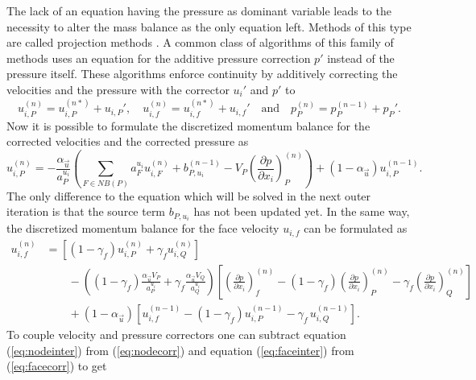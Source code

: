 The lack of an equation having the pressure as dominant variable leads to the necessity to alter the mass balance as the only equation left. Methods of this type are called projection methods \cite{ferziger02}. A common class of algorithms of this family of methods uses an equation for the additive pressure correction \(p'\) instead of the pressure itself. These algorithms enforce continuity by additively correcting the velocities and the pressure with the corrector \(u_i'\) and \(p'\) to
\begin{displaymath}
  u_{i,P}^{(n)} =  u_{i,P}^{(n*)}  + u_{i,P}',\quad u_{i,f}^{(n)} =  u_{i,f}^{(n*)}  + u_{i,f}' \quad \text{and} \quad   p_P^{(n)} =  p_P^{(n-1)}  + p_P'.
\end{displaymath}
Now it is possible to formulate the discretized momentum balance for the corrected velocities and the corrected pressure as
\begin{equation}
  \label{eq:nodecorr}
  u_{i,P}^{(n)} 
  = 
  - \frac{\alpha_{\vec{u}}}{a_P^{u_i}} \left(\sum_{F \in NB(P)} a_F^{u_i} u_{i,F}^{(n)}
  +                                     b_{P,u_i}^{(n-1)} 
  -                                     V_P\left(\frac{\partial p}{\partial x_i}\right)_P^{(n)} \right)
  + \left(1 - \alpha_{\vec{u}}\right) u_{i,P}^{(n-1)}.
\end{equation}
The only difference to the equation which will be solved in the next outer iteration is that the source term \(b_{P,u_i}\) has not been updated yet. In the same way, the discretized momentum balance for the face velocity \(u_{i,f}\) can be formulated as
\begin{align}
  \label{eq:facecorr}
  u_{i,f}^{(n)} 
  &=
  \left[\left(1 - \gamma_f\right) u_{i,P}^{(n)} + \gamma_f u_{i,Q}^{(n)} \right] \nonumber\\[1em]
  &\quad\quad - 
  \left(\left(1 - \gamma_f\right) \frac{\alpha_\vec{u} V_P}{a_P^{u_i}} + \gamma_f \frac{\alpha_\vec{u} V_Q}{a_Q^{u_i}}\right)
  \left[ 
  \left(\frac{\partial p}{\partial x_i}\right)_f^{(n)} 
  -  \left(1 - \gamma_f\right) \left( \frac{\partial p}{\partial x_i} \right)_P^{(n)} 
  - \gamma_f \left(\frac{\partial p}{\partial x_i}\right)_Q^{(n)} 
  \right] \nonumber \\[1em]
  &\quad\quad + \left(1 - \alpha_\vec{u}\right) \left[ u_{i,f}^{(n-1)} - \left(1 - \gamma_f\right) u_{i,P}^{(n-1)} - \gamma_f \, u_{i,Q}^{(n-1)} \right].
\end{align}
To couple velocity and pressure correctors one can subtract equation (\ref{eq:nodeinter}) from (\ref{eq:nodecorr}) and equation (\ref{eq:faceinter}) from (\ref{eq:facecorr}) to get
